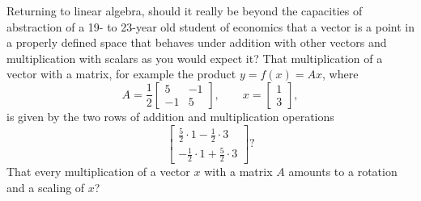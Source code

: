 \documentclass[graybox]{svmult}
\begin{document}
Returning to linear algebra, should it really be beyond the capacities of abstraction of a 19- to 23-year old student of economics that a vector is a point in a properly defined space that behaves under addition with other vectors and multiplication with scalars as you would expect it? That multiplication of a vector with a matrix, for example the product $y=f(x)=Ax$, where
\[
A = \frac{1}{2}\left[\begin{array}{cc}
5 & -1 \\
-1 & 5
\end{array}\right],\qquad 
x = \left[\begin{array}{c}
1 \\ 3
\end{array}\right],
\]
is given by the two rows of addition and multiplication operations
\[
\left[\begin{array}{c}
\frac{5}{2} \cdot 1 - \frac{1}{2}\cdot 3 \\
-\frac{1}{2} \cdot 1 + \frac{5}{2}\cdot 3
\end{array}\right]?
\]
That every multiplication of a vector $x$ with a matrix $A$ amounts to a rotation and a scaling of $x$?
\end{document}
